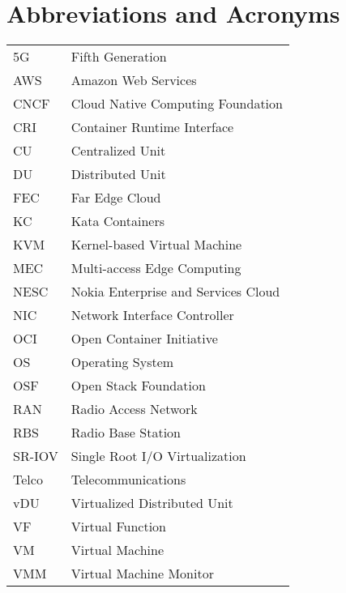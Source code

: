 \chapter*{Abbreviations and Acronyms}

\noindent
\begin{longtable}{@{}p{}p{}@{}}
5G & Fifth Generation \\
AWS & Amazon Web Services \\
CNCF & Cloud Native Computing Foundation \\
CRI & Container Runtime Interface \\
CU & Centralized Unit \\
DU & Distributed Unit \\
FEC & Far Edge Cloud \\
KC & Kata Containers \\
KVM & Kernel-based Virtual Machine \\
MEC & Multi-access Edge Computing \\
NESC & Nokia Enterprise and Services Cloud \\
NIC & Network Interface Controller \\
OCI & Open Container Initiative \\
OS & Operating System \\
OSF & Open Stack Foundation \\
RAN & Radio Access Network \\
RBS & Radio Base Station \\
SR-IOV & Single Root I/O Virtualization \\
Telco & Telecommunications \\
vDU & Virtualized Distributed Unit \\
VF & Virtual Function \\
VM & Virtual Machine \\
VMM & Virtual Machine Monitor \\



\end{longtable}
